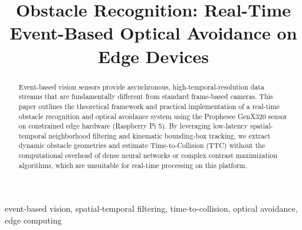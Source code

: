 \documentclass[conference]{IEEEtran}
\begin{document}
\title{Obstacle Recognition: Real-Time Event-Based Optical Avoidance on Edge Devices\\

}

\author{
\and
{}
\and
{}
}

\maketitle

\begin{abstract}
Event-based vision sensors provide asynchronous, high-temporal-resolution data streams that are fundamentally different from standard frame-based cameras. This paper outlines the theoretical framework and practical implementation of a real-time obstacle recognition and optical avoidance system using the Prophesee GenX320 sensor on constrained edge hardware (Raspberry Pi 5). By leveraging low-latency spatial-temporal neighborhood filtering and kinematic bounding-box tracking, we extract dynamic obstacle geometries and estimate Time-to-Collision (TTC) without the computational overhead of dense neural networks or complex contrast maximization algorithms, which are unsuitable for real-time processing on this platform.
\end{abstract}

\begin{IEEEkeywords}
event-based vision, spatial-temporal filtering, time-to-collision, optical avoidance, edge computing
\end{IEEEkeywords}
\end{document}
